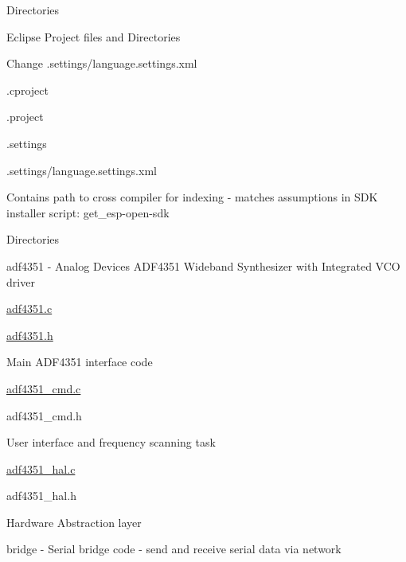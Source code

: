 \begin{DoxyParagraph}{Directories}
\begin{DoxyItemize}
\begin{DoxyItemize}
\begin{DoxyItemize}
\end{DoxyItemize}
\end{DoxyItemize}
\item Eclipse Project files and Directories
\begin{DoxyItemize}
\item Change .settings/language.\+settings.\+xml
\item .cproject
\item .project
\item .settings
\begin{DoxyItemize}
\item .settings/language.\+settings.\+xml
\begin{DoxyItemize}
\item Contains path to cross compiler for indexing -\/ matches assumptions in S\+DK installer script\+: get\+\_\+esp-\/open-\/sdk
\end{DoxyItemize}
\end{DoxyItemize}
\end{DoxyItemize}
\item Directories
\begin{DoxyItemize}
\item adf4351 -\/ Analog Devices A\+D\+F4351 Wideband Synthesizer with Integrated V\+CO driver
\begin{DoxyItemize}
\item \hyperlink{adf4351_8c}{adf4351.\+c}
\item \hyperlink{adf4351_8h}{adf4351.\+h}
\begin{DoxyItemize}
\item Main A\+D\+F4351 interface code
\end{DoxyItemize}
\item \hyperlink{adf4351__cmd_8c}{adf4351\+\_\+cmd.\+c}
\item adf4351\+\_\+cmd.\+h
\begin{DoxyItemize}
\item User interface and frequency scanning task
\end{DoxyItemize}
\item \hyperlink{adf4351__hal_8c}{adf4351\+\_\+hal.\+c}
\item adf4351\+\_\+hal.\+h
\begin{DoxyItemize}
\item Hardware Abstraction layer
\end{DoxyItemize}
\end{DoxyItemize}
\item bridge -\/ Serial bridge code -\/ send and receive serial data via network

\end{DoxyItemize}
\end{DoxyItemize}
\end{DoxyParagraph}
